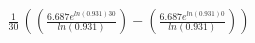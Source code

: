 \documentclass[preview]{standalone}
\begin{document}
\begin{align*}
\frac{1}{30}\,((\frac{6.687e^{ln(0.931)30}}{ln(0.931)})-(\frac{6.687e^{ln(0.931)0}}{ln(0.931)}))
\end{align*}
\end{document}

